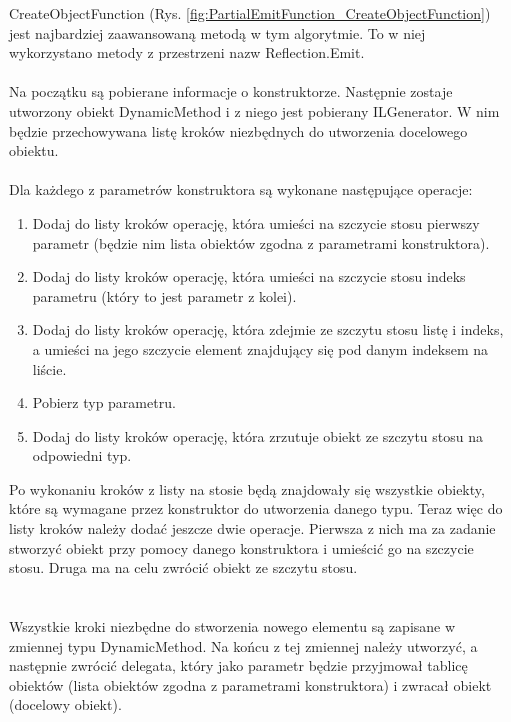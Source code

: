 \documentclass[12pt]{article}
\begin{document}
CreateObjectFunction (Rys. \ref{fig:PartialEmitFunction_CreateObjectFunction}) jest najbardziej zaawansowaną metodą w tym algorytmie. To w niej wykorzystano metody z przestrzeni nazw Reflection.Emit.\\
\\
Na początku są pobierane informacje o konstruktorze. Następnie zostaje utworzony obiekt DynamicMethod i z niego jest pobierany ILGenerator. W nim będzie przechowywana listę kroków niezbędnych do utworzenia docelowego obiektu.\\
\\
Dla każdego z parametrów konstruktora są wykonane następujące operacje:
\begin{enumerate}
	\item Dodaj do listy kroków operację, która umieści na szczycie stosu pierwszy parametr (będzie nim lista obiektów zgodna z parametrami konstruktora).
	\item Dodaj do listy kroków operację, która umieści na szczycie stosu indeks parametru (który to jest parametr z kolei).
	\item Dodaj do listy kroków operację, która zdejmie ze szczytu stosu listę i indeks, a umieści na jego szczycie element znajdujący się pod danym indeksem na liście.
	\item Pobierz typ parametru.
	\item Dodaj do listy kroków operację, która zrzutuje obiekt ze szczytu stosu na odpowiedni typ.
\end{enumerate}
Po wykonaniu kroków z listy na stosie będą znajdowały się wszystkie obiekty, które są wymagane przez konstruktor do utworzenia danego typu. Teraz więc do listy kroków należy dodać jeszcze dwie operacje. Pierwsza z nich ma za zadanie stworzyć obiekt przy pomocy danego konstruktora i umieścić go na szczycie stosu. Druga ma na celu zwrócić obiekt ze szczytu stosu.\\
\\ \\
Wszystkie kroki niezbędne do stworzenia nowego elementu są zapisane w zmiennej typu DynamicMethod. Na końcu z tej zmiennej należy utworzyć, a następnie zwrócić delegata, który jako parametr będzie przyjmował tablicę obiektów (lista obiektów zgodna z parametrami konstruktora) i zwracał obiekt (docelowy obiekt).\\ \\
\end{document}
